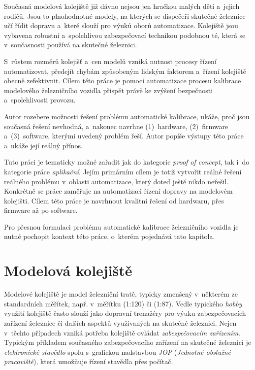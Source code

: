 Současná modelová kolejiště již dávno nejsou jen hračkou malých dětí
a~jejich rodičů. Jsou to plnohodnotné modely, na kterých se dispečeři skutečné
železnice učí řídit dopravu a~které slouží pro výuků oborů automatizace.
Kolejiště jsou vybavena robustní a~spolehlivou zabezpečovací technikou
podobnou té, která se v~současnosti používá na skutečné železnici.

S~růstem rozměrů kolejišť a~cen modelů vzniká nutnost procesy řízení
automatizovat, předejít chybám způsobeným lidským faktorem a~řízení kolejiště
obecně zefektivnit. Cílem této práce je pomocí automatizace procesu kalibrace
modelového železničního vozidla přispět právě ke zvýšení bezpečnosti
a~spolehlivosti provozu.

Autor rozebere možnosti řešení problému automatické kalibrace, uká\-že, proč
jsou současná řešení nevhodná, a~nakonec navrhne (1)~hardware, (2)~firmware
a~(3)~software, kterými uvedený problém řeší. Autor popíše výstupy této práce
a~ukáže její reálný přínos.

Tuto práci je tematicky možné zařadit jak do kategorie \textit{proof of
concept}, tak i~do kategorie práce \textit{aplikační}. Jejím primárním
cílem je totiž vytvořit reálné řešení reálného problému v~oblasti automatizace,
který doteď ještě nikdo neřešil. Konkrétně se práce zaměřuje na automatizaci
řízení dopravy na modelovém kolejišti. Cílem této práce je navrhnout kvalitní
řešení od hardwaru, přes firmware až po software.

Pro přesnou formulaci problému automatické kalibrace železničního vozidla je
nutné pochopit kontext této práce, o~kterém pojednává tato kapitola.

\section{Modelová kolejiště}
\label{sec:mod-kol}

Modelové kolejiště je model železniční tratě, typicky zmenšený v~některém ze
standardních měřítek, např. v~měřítku  (1:120) či  (1:87). Vedle
typického \textit{hobby} využití kolejiště často slouží jako dopravní trenažéry
pro výuku zabezpečovacích zařízení železnice či dalších aspektů využívaných na
skutečné železnici. Nejen v~těchto případech vzniká potřeba kolejiště ovládat
\textit{zabezpečovacím zařízením}. Typickým příkladem současného
zabezpečovacího zařízení na skutečné železnici je \textit{elektronické
stavědlo} spolu s~grafickou nadstavbou \textit{\gls{JOP}} (\textit{Jednotné
obslužné pracoviště}), která umožňuje řízení stavědla přes počítač.

